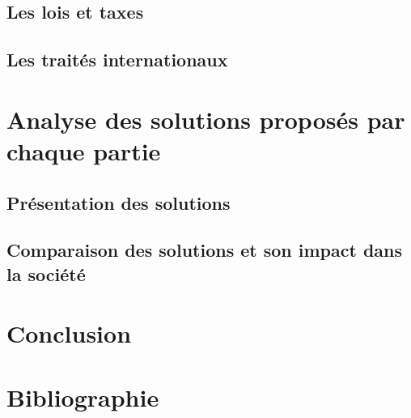 \documentclass[a4paper,11pt]{article}
\begin{document}
\subsection{Les lois et taxes}
\subsection{Les traités internationaux}


\section{Analyse des solutions proposés par chaque partie}
\subsection{Présentation des solutions}
\subsection{Comparaison des solutions et son impact dans la société}


\section*{Conclusion}
\section*{Bibliographie}
\end{document}
